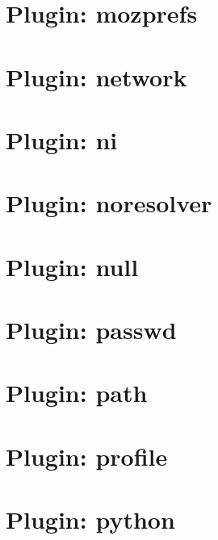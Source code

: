 \documentclass[twoside]{book}
\newcommand{\+}{\discretionary{\mbox{\scriptsize$\hookleftarrow$}}{}{}}
\begin{document}
\chapter{Plugin\+: mozprefs}
\label{md_src_plugins_mozprefs_README}
\hypertarget{md_src_plugins_mozprefs_README}{}

\chapter{Plugin\+: network}
\label{md_src_plugins_network_README}
\hypertarget{md_src_plugins_network_README}{}

\chapter{Plugin\+: ni}
\label{md_src_plugins_ni_README}
\hypertarget{md_src_plugins_ni_README}{}

\chapter{Plugin\+: noresolver}
\label{md_src_plugins_noresolver_README}
\hypertarget{md_src_plugins_noresolver_README}{}

\chapter{Plugin\+: null}
\label{md_src_plugins_null_README}
\hypertarget{md_src_plugins_null_README}{}

\chapter{Plugin\+: passwd}
\label{md_src_plugins_passwd_README}
\hypertarget{md_src_plugins_passwd_README}{}

\chapter{Plugin\+: path}
\label{md_src_plugins_path_README}
\hypertarget{md_src_plugins_path_README}{}

\chapter{Plugin\+: profile}
\label{md_src_plugins_profile_README}
\hypertarget{md_src_plugins_profile_README}{}

\chapter{Plugin\+: python}
\label{md_src_plugins_python_README}
\hypertarget{md_src_plugins_python_README}{}

\end{document}
